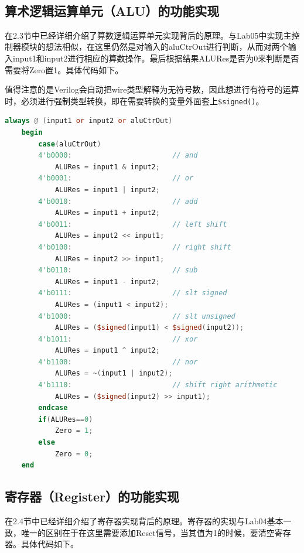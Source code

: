 \begin{lstlisting}[language=Verilog]
   
\end{lstlisting}

\subsection{算术逻辑运算单元（ALU）的功能实现}
在2.3节中已经详细介绍了算数逻辑运算单元实现背后的原理。与Lab05中实现主控制器模块的想法相似，在这里仍然是对输入的aluCtrOut进行判断，从而对两个输入input1和input2进行相应的算数操作。最后根据结果ALURes是否为0来判断是否需要将Zero置1。具体代码如下。

值得注意的是Verilog会自动把wire类型解释为无符号数，因此想进行有符号的运算时，必须进行强制类型转换，即在需要转换的变量外面套上\texttt{\$signed()}。
\begin{lstlisting}[language=Verilog]
    always @ (input1 or input2 or aluCtrOut)
    begin
        case(aluCtrOut)
        4'b0000:                        // and
            ALURes = input1 & input2;
        4'b0001:                        // or
            ALURes = input1 | input2;
        4'b0010:                        // add
            ALURes = input1 + input2;
        4'b0011:                        // left shift
            ALURes = input2 << input1;
        4'b0100:                        // right shift
            ALURes = input2 >> input1;
        4'b0110:                        // sub
            ALURes = input1 - input2;
        4'b0111:                        // slt signed
            ALURes = (input1 < input2);
        4'b1000:                        // slt unsigned
            ALURes = ($signed(input1) < $signed(input2));
        4'b1011:                        // xor
            ALURes = input1 ^ input2;
        4'b1100:                        // nor
            ALURes = ~(input1 | input2);
        4'b1110:                        // shift right arithmetic
            ALURes = ($signed(input2) >> input1);
        endcase
        if(ALURes==0)
            Zero = 1;
        else
            Zero = 0;
    end

\end{lstlisting}

\subsection{寄存器（Register）的功能实现}
在2.4节中已经详细介绍了寄存器实现背后的原理。寄存器的实现与Lab04基本一致，唯一的区别在于在这里需要添加Reset信号，当其值为1的时候，要清空寄存器。具体代码如下。

